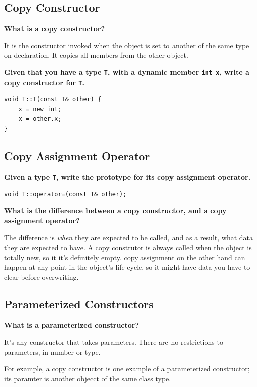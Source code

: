 \documentclass[letterpaper, 12pt]{article}
\newcommand{\question}[1]{\textbf{#1}\par}
\newenvironment{ansblock}{\color{Green4}}{\normalcolor\vspace{1em}}
\begin{document}
\subsection{Copy Constructor}
\question{What is a copy constructor?}
\begin{ansblock}
It is the constructor invoked when the object is set to another of the same
type on declaration. It copies all members from the other object.
\end{ansblock}

\question{Given that you have a type \texttt{T}, with a dynamic member
\texttt{int x}, write a copy constructor for \texttt{T}.}
\begin{verbatim}
void T::T(const T& other) {
    x = new int;
    x = other.x;
}
\end{verbatim}

\subsection{Copy Assignment Operator}
\question{Given a type \texttt{T}, write the prototype for its copy assignment
operator.}
\begin{verbatim}
void T::operator=(const T& other);
\end{verbatim}

\question{What is the difference between a copy constructor, and a copy
assignment operator?}
\begin{ansblock}
The difference is \textit{when} they are expected to be called, and as a
result, what data they are expected to have. A copy construtor is always called
when the object is totally new, so it it's definitely empty. copy assignment on
the other hand can happen at any point in the object's life cycle, so it might
have data you have to clear before overwriting.
\end{ansblock}

\subsection{Parameterized Constructors}
\question{What is a parameterized constructor?}
\begin{ansblock}
It's any constructor that takes parameters. There are no restrictions to
parameters, in number or type.

\vspace{1em}

For example, a copy constructor is one example of a parameterized constructor;
its paramter is another objecct of the same class type.
\end{ansblock}
\end{document}
